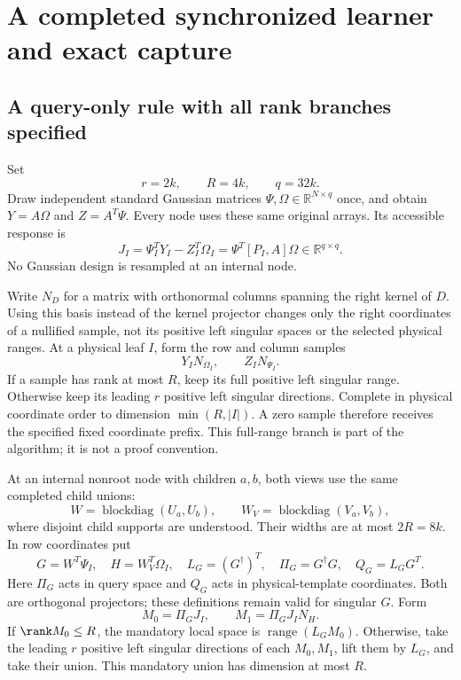\documentclass[11pt,oneside,openany,a4paper]{book}
\numberwithin{equation}{chapter}
\theoremstyle{definition}
\theoremstyle{remark}
\newcommand{\R}{\mathbb R}\newcommand{\E}{\mathbb E}\newcommand{\Prb}{\mathbb P}\newcommand{\PP}{\mathbb P}
\DeclareMathOperator{\diag}{blockdiag}\DeclareMathOperator{\range}{range}
\begin{document}
\chapter{A completed synchronized learner and exact capture}
\label{upd:chap:route-synchronized}

\section{A query-only rule with all rank branches specified}

Set
\[
 r=2k,\qquad R=4k,\qquad q=32k.
\]
Draw independent standard Gaussian matrices
$\Psi,\Omega\in\R^{N\times q}$ once, and obtain
$Y=A\Omega$ and $Z=A^T\Psi$.  Every node uses these same original
arrays.  Its accessible response is
\begin{equation}
 J_I=\Psi_I^TY_I-Z_I^T\Omega_I
     =\Psi^T[P_I,A]\Omega\in\R^{q\times q}.
 \label{upd:eq:route-commutator}
\end{equation}
No Gaussian design is resampled at an internal node.

Write $N_D$ for a matrix with orthonormal columns spanning the right
kernel of $D$.  Using this basis instead of the kernel projector changes
only the right coordinates of a nullified sample, not its positive left
singular spaces or the selected physical ranges.  At a physical leaf
$I$, form the row and column samples
\[
 Y_I N_{\Omega_I},\qquad Z_I N_{\Psi_I}.
\]
If a sample has rank at most $R$, keep its full positive left singular
range.  Otherwise keep its leading $r$ positive left singular
directions.  Complete in physical coordinate order to dimension
$\min(R,|I|)$.  A zero sample therefore receives the specified fixed
coordinate prefix.  This full-range branch is part of the algorithm;
it is not a proof convention.

At an internal nonroot node with children $a,b$, both views use the
same completed child unions:
\[
 W=\diag(U_a,U_b),\qquad W_V=\diag(V_a,V_b),
\]
where disjoint child supports are understood.  Their widths are at
most $2R=8k$.  In row coordinates put
\begin{equation}
 G=W^T\Psi_I,\quad H=W_V^T\Omega_I,\quad
 L_G=(G^\dagger)^T,\quad
 \Pi_G=G^\dagger G,\quad Q_G=L_GG^T.
 \label{upd:eq:route-local-design}
\end{equation}
Here $\Pi_G$ acts in query space and $Q_G$ acts in physical-template
coordinates.  Both are orthogonal projectors; these definitions remain
valid for singular $G$.  Form
\[
 M_0=\Pi_GJ_I,\qquad M_1=\Pi_GJ_I N_H.
\]
If $\rank M_0\leq R$, the mandatory local space is
$\range(L_GM_0)$.  Otherwise, take the leading $r$ positive left
singular directions of each $M_0,M_1$, lift them by $L_G$, and take
their union.  This mandatory union has dimension at most $R$.
\end{document}
